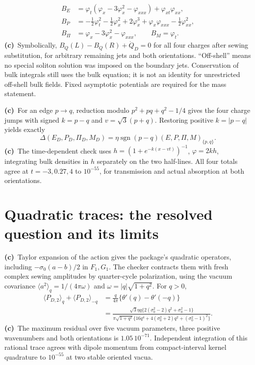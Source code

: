 \documentclass[11pt,a4paper]{article}
\newcommand{\Lc}{\textbf{(c)}\ }
\begin{document}
\begin{align}
 B_E&=\varphi_t(\varphi_x-3\varphi_x^2-\varphi_{xxx})+\varphi_{xt}\varphi_{xx},\\
 B_P&=-\tfrac12\varphi_t^2-\tfrac12\varphi_x^2+2\varphi_x^3
            +\varphi_x\varphi_{xxx}-\tfrac12\varphi_{xx}^2,\\
 B_\Pi&=\varphi_x-3\varphi_x^2-\varphi_{xxx},\qquad B_M=\varphi_t.
\end{align}
\Lc Symbolically, $B_Q(L)-B_Q(R)+\dot Q_D=0$ for all four charges after
sewing substitution, for arbitrary remaining jets and both orientations.
``Off-shell'' means no special soliton solution was imposed on the boundary
jets. Conservation of bulk integrals still uses the bulk equation; it is
not an identity for unrestricted off-shell bulk fields. Fixed asymptotic
potentials are required for the mass statement.

\Lc For an edge $p\to q$, reduction modulo $p^2+pq+q^2-1/4$ gives the
four charge jumps with signed $k=p-q$ and $v=\sqrt3(p+q)$. Restoring positive
$k=|p-q|$ yields exactly
\begin{equation}
 \Delta(E_D,P_D,\Pi_D,M_D)
 =\eta\operatorname{sgn}(p-q)(E,P,\Pi,M)_{\{p,q\}}.
\end{equation}
\Lc The time-dependent check uses $h=(1+e^{-k(x-vt)})^{-1}$,
$\varphi=2kh$, integrating bulk densities in $h$ separately on the two
half-lines. All four totals agree at $t=-3,0.27,4$ to $10^{-55}$,
for transmission and actual absorption at both orientations.

\section{Quadratic traces: the resolved question and its limits}
\Lc Taylor expansion of the action gives the package's quadratic operators,
including $-\sigma_0(a-b)/2$ in $F_1,G_1$. The checker contracts them with
fresh complex sewing amplitudes by quarter-cycle polarization, using the
vacuum covariance $\langle a^2\rangle_q=1/(4\pi\omega)$ and
$\omega=|q|\sqrt{1+q^2}$. For $q>0$,
\begin{align}
 \langle P_{D,2}\rangle_q+\langle P_{D,2}\rangle_{-q}
 &=\frac{q}{4\pi}\{\theta'(q)-\theta'(-q)\}\\
 &=\frac{\sqrt3\eta q\{2(\sigma_0^2-2)q^2+\sigma_0^2-1\}}
 {\pi\sqrt{1+q^2}\{16q^4+4(\sigma_0^2+2)q^2+(\sigma_0^2-1)^2\}}.
 \label{eq:ptrace}
\end{align}
\Lc The maximum residual over five vacuum parameters, three positive
wavenumbers and both orientations is $1.05\,10^{-71}$. Independent integration
of this rational trace agrees with dipole momentum from compact-interval
kernel quadrature to $10^{-55}$ at two stable oriented vacua.
\end{document}
